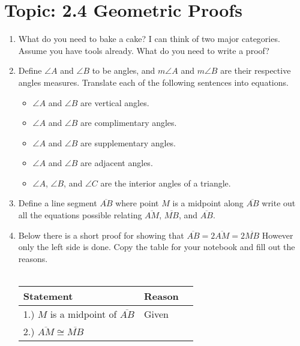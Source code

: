 \documentclass[12pt,letterpaper]{article}
\begin{document}
\section*{Topic: 2.4 Geometric Proofs}
\begin{enumerate}
    \item What do you need to bake a cake? I can think of two major categories. Assume you have tools already. What do you need to write a proof?
    \item Define $\angle A$ and $\angle B$ to be angles, and $m\angle A$ and $m\angle B$ are their respective angles measures. Translate each of the following sentences into equations.
          \begin{itemize}
              \item $\angle A$ and $\angle B$ are vertical angles.
              \item $\angle A$ and $\angle B$ are complimentary angles.
              \item $\angle A$ and $\angle B$ are supplementary angles.
              \item $\angle A$ and $\angle B$ are adjacent angles.
              \item $\angle A$, $\angle B$, and $\angle C$ are the interior angles of a triangle.
          \end{itemize}
    \item Define a line segment $\overline{AB}$ where point $M$ is a midpoint along $\overline{AB}$ write out all the equations possible relating $\overline{AM}$, $\overline{MB}$, and $\overline{AB}$.
    \item Below there is a short proof for showing that $\overline{AB}=2\overline{AM}=2\overline{MB}$ However only the left side is done. Copy the table for your notebook and fill out the reasons.\\\\
          \begin{tabularx}{0.95\textwidth} {
                  | >{\raggedright\arraybackslash}X
                  | >{\centering\arraybackslash}X
                  | >{\raggedleft\arraybackslash}X |}
              \hline
              Statement                                                        & Reason \\
              \hline
              \vspace{0.5mm} 1.) $M$ is a midpoint of $\overline{AB}$          & Given  \\
              \hline
              \vspace{0.5mm} 2.) $\overline{AM}\cong\overline{MB}$             &        \\

\end{tabularx}
\end{enumerate}
\end{document}
